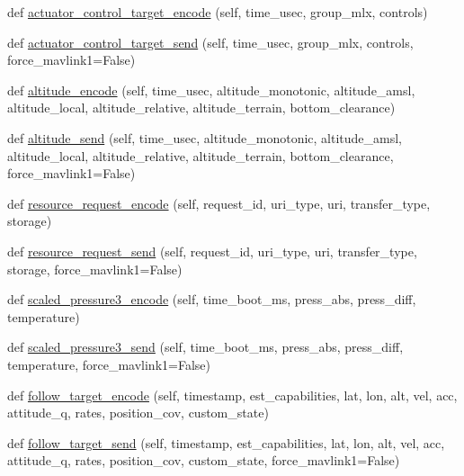 \begin{DoxyCompactItemize}
\item 
def \hyperlink{classpymavlink_1_1dialects_1_1v10_1_1MAVLink_a4aa503e7dff90e3be9cd3549aae2b7b5}{actuator\+\_\+control\+\_\+target\+\_\+encode} (self, time\+\_\+usec, group\+\_\+mlx, controls)
\item 
def \hyperlink{classpymavlink_1_1dialects_1_1v10_1_1MAVLink_a61e70d37e42f04e5e5528fdf328cb6b1}{actuator\+\_\+control\+\_\+target\+\_\+send} (self, time\+\_\+usec, group\+\_\+mlx, controls, force\+\_\+mavlink1=False)
\item 
def \hyperlink{classpymavlink_1_1dialects_1_1v10_1_1MAVLink_a250fe68fab98e6db77206ac42e53f400}{altitude\+\_\+encode} (self, time\+\_\+usec, altitude\+\_\+monotonic, altitude\+\_\+amsl, altitude\+\_\+local, altitude\+\_\+relative, altitude\+\_\+terrain, bottom\+\_\+clearance)
\item 
def \hyperlink{classpymavlink_1_1dialects_1_1v10_1_1MAVLink_a75011d00ef837df3bc28eb22daf9db66}{altitude\+\_\+send} (self, time\+\_\+usec, altitude\+\_\+monotonic, altitude\+\_\+amsl, altitude\+\_\+local, altitude\+\_\+relative, altitude\+\_\+terrain, bottom\+\_\+clearance, force\+\_\+mavlink1=False)
\item 
def \hyperlink{classpymavlink_1_1dialects_1_1v10_1_1MAVLink_af9f6a3855ae39f97a12a04a528c093c6}{resource\+\_\+request\+\_\+encode} (self, request\+\_\+id, uri\+\_\+type, uri, transfer\+\_\+type, storage)
\item 
def \hyperlink{classpymavlink_1_1dialects_1_1v10_1_1MAVLink_a586aeaaaa018697bc791ddbd8afdec04}{resource\+\_\+request\+\_\+send} (self, request\+\_\+id, uri\+\_\+type, uri, transfer\+\_\+type, storage, force\+\_\+mavlink1=False)
\item 
def \hyperlink{classpymavlink_1_1dialects_1_1v10_1_1MAVLink_a12ff6905f51fb8be69f62f5a673a19ae}{scaled\+\_\+pressure3\+\_\+encode} (self, time\+\_\+boot\+\_\+ms, press\+\_\+abs, press\+\_\+diff, temperature)
\item 
def \hyperlink{classpymavlink_1_1dialects_1_1v10_1_1MAVLink_a3225152a125ae8e3eb88fbec5c0f6024}{scaled\+\_\+pressure3\+\_\+send} (self, time\+\_\+boot\+\_\+ms, press\+\_\+abs, press\+\_\+diff, temperature, force\+\_\+mavlink1=False)
\item 
def \hyperlink{classpymavlink_1_1dialects_1_1v10_1_1MAVLink_a691c5a98e578c3d885a11883a34dd8e4}{follow\+\_\+target\+\_\+encode} (self, timestamp, est\+\_\+capabilities, lat, lon, alt, vel, acc, attitude\+\_\+q, rates, position\+\_\+cov, custom\+\_\+state)
\item 
def \hyperlink{classpymavlink_1_1dialects_1_1v10_1_1MAVLink_a88c2ba5a0d97e7b3c71a6b03182d6f1a}{follow\+\_\+target\+\_\+send} (self, timestamp, est\+\_\+capabilities, lat, lon, alt, vel, acc, attitude\+\_\+q, rates, position\+\_\+cov, custom\+\_\+state, force\+\_\+mavlink1=False)

\end{DoxyCompactItemize}
